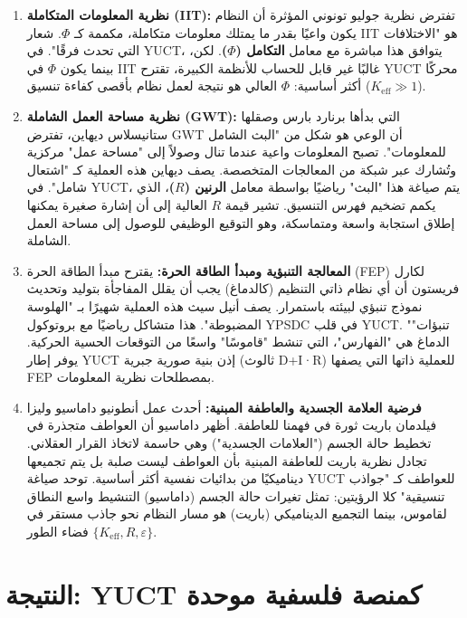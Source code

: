\documentclass[12pt,a4paper]{article}
\begin{document}
	\begin{enumerate}
		\item \textbf{نظرية المعلومات المتكاملة (IIT):} تفترض نظرية جوليو تونوني المؤثرة أن النظام يكون واعيًا بقدر ما يمتلك معلومات متكاملة، مكممة كـ \(\Phi\). شعار IIT هو "الاختلافات التي تحدث فرقًا". في YUCT، يتوافق هذا مباشرة مع معامل \textbf{التكامل (\(\Phi\))}. لكن، بينما يكون \(\Phi\) في IIT غالبًا غير قابل للحساب للأنظمة الكبيرة، تقترح YUCT محركًا أكثر أساسية: \(\Phi\) العالي هو نتيجة لعمل نظام بأقصى كفاءة تنسيق (\(K_{\mathrm{eff}} \gg 1\)).
		
		\item \textbf{نظرية مساحة العمل الشاملة (GWT):} التي بدأها برنارد بارس وصقلها ستانيسلاس ديهاين، تفترض GWT أن الوعي هو شكل من "البث الشامل للمعلومات". تصبح المعلومات واعية عندما تنال وصولاً إلى "مساحة عمل" مركزية وتُشارك عبر شبكة من المعالجات المتخصصة. يصف ديهاين هذه العملية كـ "اشتعال شامل". في YUCT، يتم صياغة هذا "البث" رياضيًا بواسطة معامل \textbf{الرنين (\(R\))}، الذي يكمم تضخيم فهرس التنسيق. تشير قيمة \(R\) العالية إلى أن إشارة صغيرة يمكنها إطلاق استجابة واسعة ومتماسكة، وهو التوقيع الوظيفي للوصول إلى مساحة العمل الشاملة.
		
		\item \textbf{المعالجة التنبؤية ومبدأ الطاقة الحرة:} يقترح مبدأ الطاقة الحرة (FEP) لكارل فريستون أن أي نظام ذاتي التنظيم (كالدماغ) يجب أن يقلل المفاجأة بتوليد وتحديث نموذج تنبؤي لبيئته باستمرار. يصف أنيل سيث هذه العملية شهيرًا بـ "الهلوسة المضبوطة". هذا متشاكل رياضيًا مع بروتوكول YPSDC في قلب YUCT. "تنبؤات" الدماغ هي "الفهارس"، التي تنشط "قاموسًا" واسعًا من التوقعات الحسية الحركية. يوفر إطار YUCT إذن بنية صورية جبرية (ثالوث D+I·R) للعملية ذاتها التي يصفها FEP بمصطلحات نظرية المعلومات.
		
		\item \textbf{فرضية العلامة الجسدية والعاطفة المبنية:} أحدث عمل أنطونيو داماسيو وليزا فيلدمان باريت ثورة في فهمنا للعاطفة. أظهر داماسيو أن العواطف متجذرة في تخطيط حالة الجسم ("العلامات الجسدية") وهي حاسمة لاتخاذ القرار العقلاني. تجادل نظرية باريت للعاطفة المبنية بأن العواطف ليست صلبة بل يتم تجميعها ديناميكيًا من بدائيات نفسية أكثر أساسية. توحد صياغة YUCT للعواطف كـ "جواذب تنسيقية" كلا الرؤيتين: تمثل تغيرات حالة الجسم (داماسيو) التنشيط واسع النطاق لقاموس، بينما التجميع الديناميكي (باريت) هو مسار النظام نحو جاذب مستقر في فضاء الطور \(\{K_{\mathrm{eff}}, R, \varepsilon\}\).
	\end{enumerate}
	
	\section{النتيجة: YUCT كمنصة فلسفية موحدة}
	
\end{document}
